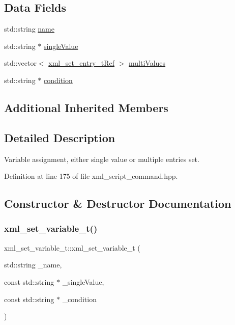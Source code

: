 \subsection*{Data Fields}
\begin{DoxyCompactItemize}
\item 
std\+::string \hyperlink{classxml__set__variable__t_a5fecba6d9ebea723a3deb6e7910077d1}{name}
\item 
std\+::string $\ast$ \hyperlink{classxml__set__variable__t_a06c35d7c0c7beadfa65b51b55aed74ab}{single\+Value}
\item 
std\+::vector$<$ \hyperlink{xml__script__command_8hpp_aeb61f959795afd2b743d3bec00ee66fa}{xml\+\_\+set\+\_\+entry\+\_\+t\+Ref} $>$ \hyperlink{classxml__set__variable__t_a3a8621898eb705400967bebe067afa8c}{multi\+Values}
\item 
std\+::string $\ast$ \hyperlink{classxml__set__variable__t_a6193b0aff8e356ced7ad7b0c65c28f6f}{condition}
\end{DoxyCompactItemize}
\subsection*{Additional Inherited Members}


\subsection{Detailed Description}
Variable assignment, either single value or multiple entries set. 

Definition at line 175 of file xml\+\_\+script\+\_\+command.\+hpp.



\subsection{Constructor \& Destructor Documentation}
\mbox{\label{classxml__set__variable__t_a744647881b084c28dc5d110134f91807}} 
\subsubsection{\texorpdfstring{xml\+\_\+set\+\_\+variable\+\_\+t()}{xml\_set\_variable\_t()}\hspace{0.1cm}{\footnotesize\ttfamily [1/2]}}
{\footnotesize\ttfamily xml\+\_\+set\+\_\+variable\+\_\+t\+::xml\+\_\+set\+\_\+variable\+\_\+t (\begin{DoxyParamCaption}\item[{std\+::string}]{\+\_\+name,  }\item[{const std\+::string $\ast$}]{\+\_\+single\+Value,  }\item[{const std\+::string $\ast$}]{\+\_\+condition }\end{DoxyParamCaption})}



